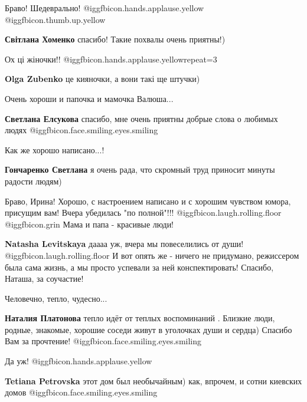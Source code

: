 \begin{itemize}
Браво! Шедеврально! @igg{fbicon.hands.applause.yellow}  @igg{fbicon.thumb.up.yellow} 

\textbf{Світлана Хоменко} спасибо! Такие похвалы очень приятны!)

Ох ці жіночки!! @igg{fbicon.hands.applause.yellow}{repeat=3} 

\textbf{Olga Zubenko} це кияночки, а вони такі ще штучки)

Очень хороши и папочка и мамочка Валюша...

\textbf{Светлана Елсукова} спасибо, мне очень приятны добрые слова о любимых людях  @igg{fbicon.face.smiling.eyes.smiling} 

Как же хорошо написано...!

\textbf{Гончаренко Светлана} я очень рада, что скромный труд приносит минуты радости людям)


Браво, Ирина! Хорошо, с настроением написано и с хорошим чувством юмора,
присущим вам! Вчера убедилась "по полной"!!!  @igg{fbicon.laugh.rolling.floor}  @igg{fbicon.grin}  Мама и папа - красивые люди!

\begin{itemize} %
\textbf{Natasha Levitskaya} даааа уж, вчера мы повеселились от души! @igg{fbicon.laugh.rolling.floor}  И вот опять же - ничего не придумано, режиссером была сама жизнь, а мы просто успевали за ней конспектировать! Спасибо, Наташа, за соучастие!
\end{itemize} %

Человечно, тепло, чудесно...

\begin{itemize} %
\textbf{Наталия Платонова} тепло идёт от теплых воспоминаний . Близкие люди, родные, знакомые, хорошие соседи живут в уголочках души и сердца) Спасибо Вам за прочтение! @igg{fbicon.face.smiling.eyes.smiling} 
\end{itemize} %


Да уж! @igg{fbicon.hands.applause.yellow} 

\textbf{Tetiana Petrovska} этот дом был необычайным) как, впрочем, и сотни киевских домов @igg{fbicon.face.smiling.eyes.smiling} 


\end{itemize}
